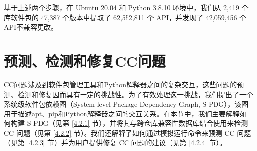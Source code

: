 基于上述两个步骤，在 Ubuntu 20.04 和 Python 3.8.10 环境中，我们从 2,419 个库软件包的 47,387 个版本中提取了 62,552,811 个 API，并发现了 42,059,456 个API不兼容更改。

\section{预测、检测和修复CC问题}\label{4.2}
CC问题涉及到软件包管理工具和Python解释器之间的复杂交互，这些问题的预测、检测和修复因而具有一定的挑战性。为了有效处理这一挑战，我们提出了一个系统级软件包依赖图（System-level Package Dependency Graph, S-PDG），该图用于描述apt、pip和Python解释器之间的交互关系。在本节中，我们主要解释如何构建 S-PDG（见第 \ref{4.2.1} 节），并将其与跨仓库兼容性数据库结合使用来检测 CC 问题（见第 \ref{4.2.2} 节）。我们还解释了如何通过模拟运行命令来预测 CC 问题（见第 \ref{4.2.3} 节）并为用户提供修复 CC 问题的建议（见第 \ref{4.2.4} 节）。
